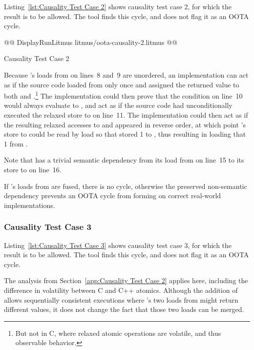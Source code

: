 \documentclass[10]{article}
\begin{document}
Listing~\ref{lst:Causality Test Case 2}
shows causality test case 2, for which the  result
is to be allowed.
The  tool finds this cycle, and does not flag it as an OOTA cycle.

\begin{listing}[tbp]
@@ DisplayRunLitmus litmus/oota-causality-2.litmus @@
\caption{Causality Test Case 2}
\label{lst:Causality Test Case 2}
\end{listing}

Because 's loads from  on lines~8 and~9 are unordered,
an implementation can act as if the source code loaded from  only
once and assigned the returned value to both  and .\footnote{
	But not in C, where relaxed atomic operations are volatile,
	and thus observable behavior.}
The implementation could then prove that the condition on line~10
would always evaluate to , and act as if the source code had
unconditionally executed the relaxed store to  on line~11.
The implementation could then act as if the resulting relaxed accesses
to  and  appeared in reverse order, at which point
's store to  could be read by  load so that
 stored 1 to , thus resulting in  loading
that 1 from .

Note that  has a trivial semantic dependency from its load
from  on line~15 to its store to  on line~16.

If 's loads from  are fused, there is no cycle,
otherwise the preserved non-semantic dependency prevents an
OOTA cycle from forming on correct real-world implementations.

\subsubsection{Causality Test Case 3}
\label{app:Causality Test Case 3}

Listing~\ref{lst:Causality Test Case 3}
shows causality test case 3, for which the  result
is to be allowed.
The  tool finds this cycle, and does not flag it as an OOTA cycle.

The analysis from Section~\ref{app:Causality Test Case 2}
applies here, including the difference in volatility between C and C++
atomics.
Although the addition of  allows sequentially consistent executions
where 's two loads from  might return different values,
it does not change the fact that those two loads can be merged.
\end{document}
